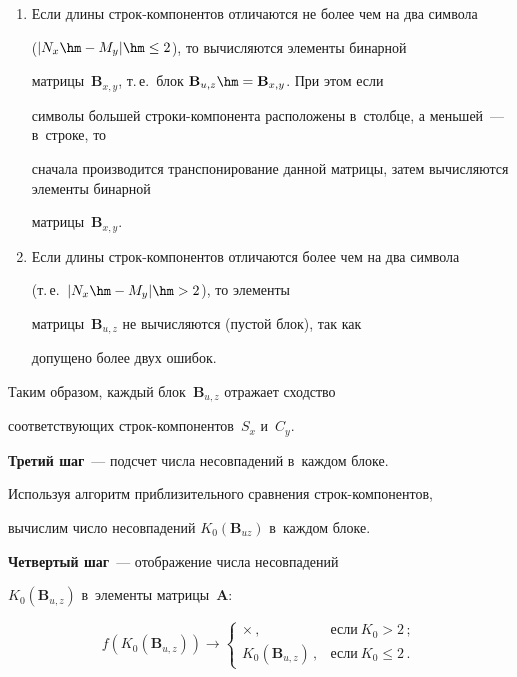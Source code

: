   \begin{enumerate}[1.]


   \item Если длины строк-компонентов отличаются не более чем на два символа 


   ($\vert N_x\hm- M_y\vert \hm\leq 2$), то вычисляются элементы бинарной 


матрицы~$\mathbf{B}_{x,y}$, т.\,е.\ блок $\mathbf{B}_{u,z}\hm= \mathbf{B}_{x,y}$. При этом если 


символы большей стро\-ки-ком\-по\-нен\-та расположены в~столбце, а меньшей~--- в~строке, то 


сначала производится транспонирование данной матрицы, затем вычисляются элементы бинарной 


матрицы~$\mathbf{B}_{x,y}$.


\item Если длины строк-компонентов отличаются более чем на два символа 


(т.\,е.\ $\vert N_x\hm- M_y\vert \hm>2$), то элементы 


матрицы~$\mathbf{B}_{u,z}$ не вычисляются (пустой блок), так как 


допущено более двух ошибок. 


\end{enumerate}





  Таким образом, каждый блок~$\mathbf{B}_{u,z}$ отражает сходство 


соответствующих строк-ком\-по\-нен\-тов~$S_x$ и~$C_y$. 


  


  \textbf{Третий шаг}~--- подсчет числа несовпадений в~каждом блоке. 


  


  Используя алгоритм приблизительного сравнения строк-ком\-по\-нен\-тов, 


вы\-чис\-лим число несовпадений $K_0(\mathbf{B}_{uz})$ в~каждом блоке.


  


  \textbf{Четвертый шаг}~--- отображение числа несовпадений 


$K_0(\mathbf{B}_{u,z})$ в~элементы матрицы~$\mathbf{A}$: 


  \begin{equation*}


  f\left( K_0\left( \mathbf{B}_{u,z}\right)\right) \to \begin{cases}


  \times\,, & \mbox{если}\ K_0>2\,;\\


  K_0(\mathbf{B}_{u,z})\,, & \mbox{если}\ K_0\leq 2\,.


  \end{cases}




  \end{equation*}


